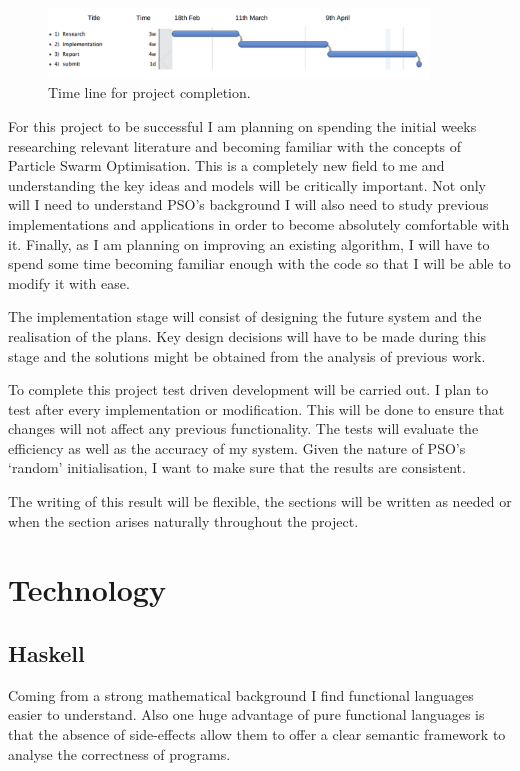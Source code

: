 \documentclass{pdfmx4020}
\begin{document}
  \begin{figure}[H]
      \centering
        \includegraphics[width=0.9\textwidth]{time-line}
      \caption{Time line for project completion.}
      \label{timline}
  \end{figure}

  For this project to be successful I am planning on spending the initial weeks researching relevant literature and becoming familiar with the concepts of Particle Swarm Optimisation. This is a completely new field to me and understanding the key ideas and models will be critically important. Not only will I need to understand PSO's background I will also need to study previous implementations and applications in order to become absolutely comfortable with it. Finally, as I am planning on improving an existing algorithm, I will have to spend some time becoming familiar enough with the code so that I will be able to modify it with ease.

  The implementation stage will consist of designing the future system and the realisation of the plans. Key design decisions will have to be made during this stage and the solutions might be obtained from the analysis of previous work. 

  To complete this project test driven development will be carried out. I plan to test after every implementation or modification. This will be done to ensure that changes will not affect any previous functionality. The tests will evaluate the efficiency as well as the accuracy of my system. Given the nature of PSO's `random' initialisation,  I want to make sure that the results are consistent. 

  The writing of this result will be flexible, the sections will be written as needed or when the section arises naturally throughout the project. 


  \section{Technology} %
  \label{sec:technology}

    \subsection{Haskell} %
    \label{sub:haskell}
      Coming from a strong mathematical background I find functional languages easier to understand. Also one huge advantage of pure functional languages is that the absence of side-effects allow them to offer a clear semantic framework to analyse the correctness of programs. 
\end{document}
